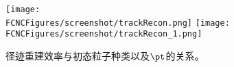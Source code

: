 \begin{figure}[htb]
\centering
\texttt{[image: \\FCNCFigures/screenshot/trackRecon.png]}
\texttt{[image: \\FCNCFigures/screenshot/trackRecon\_1.png]}
\caption{径迹重建效率与初态粒子种类以及$\pt$的关系。}
\label{fig:trackRecon}
\end{figure}
